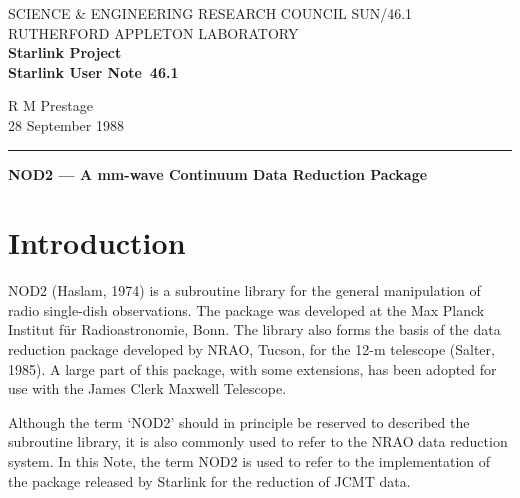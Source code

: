 \pagestyle{myheadings}

\newcommand{\stardoccategory}  {Starlink User Note}
\newcommand{\stardocinitials}  {SUN}
\newcommand{\stardocnumber}    {46.1}
\newcommand{\stardocauthors}   {R M Prestage}
\newcommand{\stardocdate}      {28 September 1988}
\newcommand{\stardoctitle}     {NOD2 --- A mm-wave Continuum Data Reduction
                                Package}

\newcommand{\stardocname}{\stardocinitials /\stardocnumber}
\markright{\stardocname}
\setlength{\textwidth}{160mm}
\setlength{\textheight}{240mm}
\setlength{\topmargin}{-5mm}
\setlength{\oddsidemargin}{0mm}
\setlength{\evensidemargin}{0mm}
\setlength{\parindent}{0mm}
\setlength{\parskip}{\medskipamount}
\setlength{\unitlength}{1mm}


\thispagestyle{empty}
SCIENCE \& ENGINEERING RESEARCH COUNCIL \hfill \stardocname\\
RUTHERFORD APPLETON LABORATORY\\
{\large\bf Starlink Project\\}
{\large\bf \stardoccategory\ \stardocnumber}
\begin{flushright}
\stardocauthors\\
\stardocdate
\end{flushright}
\vspace{-4mm}
\rule{\textwidth}{0.5mm}
\vspace{5mm}
\begin{center}
{\Large\bf \stardoctitle}
\end{center}
\vspace{5mm}

\section{Introduction}                  

NOD2 (Haslam, 1974) is a subroutine library for the general
manipulation of radio single-dish observations. The package was
developed at the Max Planck Institut f\"{u}r Radioastronomie, Bonn. The 
library also forms the basis of the data reduction
package developed by NRAO, Tucson, for the 12-m telescope (Salter, 1985).
A large part of this package, with some extensions, has been adopted for
use with the James Clerk Maxwell Telescope.

Although the term `NOD2' should in principle be reserved to described
the subroutine library, it is also commonly used to refer to the NRAO
data reduction system. In this Note, the term NOD2 is used to refer to
the implementation of the package released by Starlink for the reduction
of JCMT data.                    
                      
